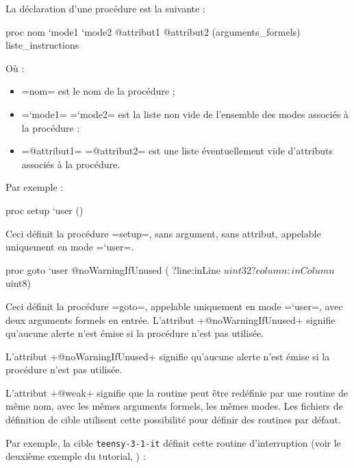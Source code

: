 La déclaration d'une procédure est la suivante :
\begin{PLM}
proc nom `mode1 `mode2 @attribut1 @attribut2 (arguments_formels) {
  liste_instructions
}
\end{PLM}
Où :
\begin{itemize}
  \item \plm=nom= est le nom de la procédure ;
  \item \plm=`mode1= \plm=`mode2= est la liste non vide de l'ensemble des modes associés à la procédure ;
  \item \plm=@attribut1= \plm=@attribut2= est une liste éventuellement vide d'attributs associés à la procédure.
\end{itemize}

Par exemple :

\begin{PLM}
proc setup `user () {
}
\end{PLM}

Ceci définit la procédure \plm=setup=, sans argument, sans attribut, appelable uniquement en mode \plm=`user=.

\begin{PLM}
proc goto `user @noWarningIfUnused (
  ?line:inLine $uint32
  ?column:inColumn $uint8) {
}
\end{PLM}

Ceci définit la procédure \plm=goto=, appelable uniquement en mode \plm=`user=, avec deux arguments formels en entrée. L'attribut \plm+@noWarningIfUnused+ signifie qu'aucune alerte n'est émise si la procédure n'est pas utilisée.








L'attribut \plm+@noWarningIfUnused+ signifie qu'aucune alerte n'est émise si la procédure n'est pas utilisée.




L'attribut \plm+@weak+ signifie que la routine peut être redéfinie par une routine de même nom, avec les mêmes arguments formels, les mêmes modes. Les fichiers de définition de cible utilisent cette possibilité pour définir des routines par défaut.

Par exemple, la cible \texttt{teensy-3-1-it} définit cette routine d'interruption (voir le deuxième exemple du tutorial, ) :

